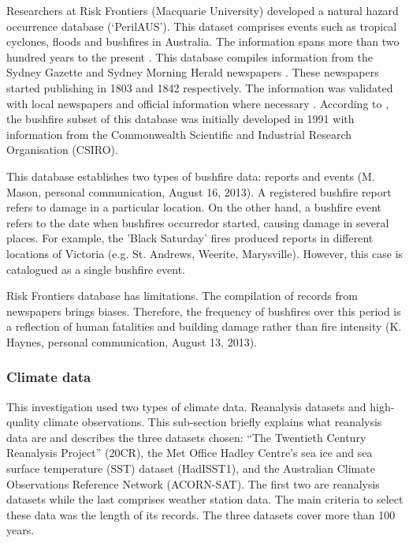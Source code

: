 Researchers at Risk Frontiers (Macquarie University) developed a natural
hazard occurrence database (\textquoteleft PerilAUS\textquoteright ).
This dataset comprises events such as tropical cyclones, floods and
bushfires in Australia. The information spans more than two hundred
years to the present \citep{Haynes2010}. This database compiles information
from the Sydney Gazette and Sydney Morning Herald newspapers \citet{Coates1996}.
These newspapers started publishing in 1803 and 1842 respectively.
The information was validated with local newspapers and official information
where necessary \citep{Crompton2010}. According to \citet{Coates1996},
the bushfire subset of this database was initially developed in 1991
with information from the Commonwealth Scientific and Industrial Research
Organisation (CSIRO). 

This database establishes two types of bushfire data: reports and
events (M. Mason, personal communication, August 16, 2013). A registered
bushfire report refers to damage in a particular location. On the
other hand, a bushfire event refers to the date when bushfires occurred\textemdash or
started\textemdash , causing damage in several places. For example,
the 'Black Saturday' fires produced reports in different locations
of Victoria (e.g. St. Andrews, Weerite, Marysville). However, this
case is catalogued as a single bushfire event. 

Risk Frontiers database has limitations. The compilation of records
from newspapers brings biases. Therefore, the frequency of bushfires
over this period is a reflection of human fatalities and building
damage rather than fire intensity (K. Haynes, personal communication,
August 13, 2013).


\subsubsection{Climate data \label{sub:Climate-data}}

This investigation used two types of climate data. Reanalysis datasets
and high-quality climate observations. This sub-section briefly explains
what reanalysis data are and describes the three datasets chosen:
``The Twentieth Century Reanalysis Project'' (20CR), the Met Office
Hadley Centre\textquoteright s sea ice and sea surface temperature
(SST) dataset (HadISST1), and the Australian Climate Observations
Reference Network (ACORN-SAT). The first two are reanalysis datasets
while the last comprises weather station data. The main criteria to
select these data was the length of its records. The three datasets
cover more than 100 years.

